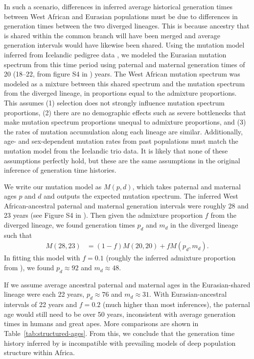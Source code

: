 \documentclass[]{article}
\begin{document}
In such a scenario, differences in inferred average historical generation times
between West African and Eurasian populations must be due to differences in
generation times between the two diverged lineages. This is because ancestry
that is shared within the common branch will have been merged and average
generation intervals would have likewise been shared.
Using the mutation model
\citet{wang2023human} inferred from Icelandic pedigree data
\citep{jonsson2017parental}, we modeled the Eurasian mutation spectrum from
this time period using paternal and maternal generation times of 20 (18--22,
from figure S4 in \citeauthor{wang2023human}) years. The West African mutation
spectrum was modeled as a mixture between this shared spectrum and the mutation
spectrum from the diverged lineage, in proportions equal to the admixture
proportions. This assumes (1) selection does not strongly influence mutation
spectrum proportions, (2) there are no demographic effects such as severe
bottlenecks that make mutation spectrum proportions unequal to admixture
proportions, and (3) the rates of mutation accumulation along each lineage are
similar. Additionally, age- and sex-dependent mutation rates from past
populations must match the mutation model from the Icelandic trio data. It is
likely that none of these assumptions perfectly hold, but these are the same
assumptions in the original inference of generation time histories.

We write our mutation model as $M(p, d)$, which takes paternal and maternal
ages $p$ and $d$ and outputs the expected mutation spectrum. The inferred West
African-ancestral paternal and maternal generation intervals were roughly 28
and 23 years (see Figure S4 in \citet{wang2023human}). Then given the
admixture proportion $f$ from the diverged lineage, we found generation times
$p_d$ and $m_d$ in the diverged lineage such that
\begin{align*}
    M(28, 23) & = (1-f)M(20, 20) + fM(p_d, m_d).
\end{align*}
In fitting this model with $f=0.1$ (roughly the inferred admixture proportion
from \citet{durvasula2020recovering}), we found $p_d\approx92$ and
$m_d\approx48$.

If we assume average ancestral paternal and maternal ages in the
Eurasian-shared lineage were each 22 years, $p_d\approx76$ and $m_d\approx31$. 
With Eurasian-ancestral intervals of 22 years and $f=0.2$ (much higher than
most inferences), the paternal age would still need to be over 50 years,
inconsistent with average generation times in humans and great apes.
More comparisons are shown in Table~\ref{tab:structured-ages}.
From this, we conclude that the generation time history inferred by
\citet{wang2023human} is incompatible with prevailing models of deep population
structure within Africa.
\end{document}
